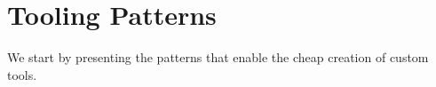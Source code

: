 \documentclass[acmsmall,screen,authorversion,nonacm]{acmart} %
\newcommand\rb[1]{\nbc{Ralf}{#1}{teal}}
\newcommand\wc[1]{\nbc{Ward}{#1}{teal}}
\newcommand\pp[1]{\nbe{Petr}{#1}{cyan}} %
\newcommand\cp[1]{\nbe{Cesare}{#1}{olive}} %
\newcommand\ws[1]{\nbe{Workshop}{#1}{teal}} %
\begin{document}

\section{Tooling Patterns}\label{sec:tooling}

We start by presenting the patterns that enable the cheap creation of custom tools.




\end{document}
